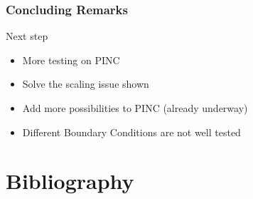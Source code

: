\documentclass{beamer}
\begin{document}
\begin{frame}
	\frametitle{Concluding Remarks}
	Next step
	\begin{itemize}
		\item More testing on PINC
		\item Solve the scaling issue shown
		\item Add more possibilities to PINC (already underway)
		\item Different Boundary Conditions are not well tested 
	\end{itemize}
\end{frame}

\section{Bibliography}
\begin{frame}
	\printbibliography
\end{frame}
\end{document}
